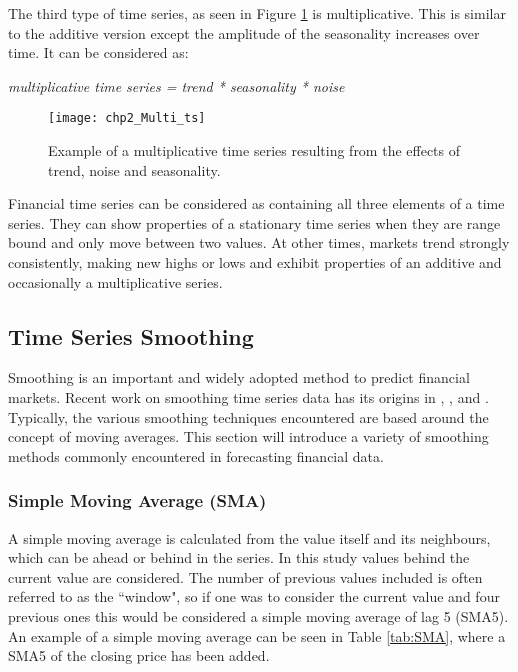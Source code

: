 The third type of time series, as seen in Figure \ref{fig:Multi_ts} is multiplicative. This is similar to the additive version except the amplitude of the seasonality increases over time. It can be considered as:

\begin{center}
\textit{multiplicative time series = trend * seasonality * noise}
\end{center}

\begin{figure}[tbph!]
\centering
\texttt{[image: chp2\_Multi\_ts]}
\caption[A multiplicative time series]{Example of a multiplicative time series resulting from the effects of trend, noise and seasonality.}
\label{fig:Multi_ts}
\end{figure}

Financial time series can be considered as containing all three elements of a time series. They can show properties of a stationary time series when they are range bound and only move between two values. At other times, markets trend strongly consistently, making new highs or lows and exhibit properties of an additive and occasionally a multiplicative series.

\subsection{Time Series Smoothing}
\label{sec:expsmoothing}
Smoothing is an important and widely adopted method to predict financial markets.  Recent work on smoothing time series data has its origins in \cite{brown1959statistical}, \cite{brown1963statistical}, \cite{Holt20045} and \cite{Winters1960}. Typically, the various smoothing techniques encountered are based around the concept of moving averages. This section will introduce a variety of smoothing methods commonly encountered in forecasting financial data. 

\subsubsection{Simple Moving Average (SMA)}
\label{sec:chp2_sma}
A simple moving average is calculated from the value itself and its neighbours, which can be ahead or behind in the series. In this study values behind the current value are considered. The number of previous values included is often referred to as the \textquotedblleft window", so if one was to consider the current value and four previous ones this would be considered a simple moving average of lag 5 (SMA5). An example of a simple moving average can be seen in Table \ref{tab:SMA}, where a SMA5 of the closing price has been added.

